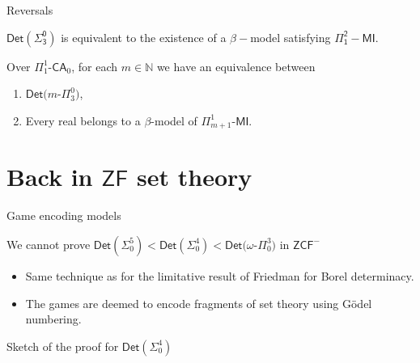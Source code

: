 \documentclass{beamer} %
\begin{document}

\begin{frame}{Reversals}
 
    \begin{theorem}[Hachtman]
        $\mathsf{Det(\Sigma_3^0)}$ is equivalent to the existence of a $\beta-$model 
        satisfying $\mathsf{\Pi_1^2-MI}$.
    \end{theorem}

    \begin{theorem}
        Over $\Pi_1^1$-$\mathsf{CA}_0$, for each $m\in \mathbb{N}$ we have an 
        equivalence between 
        \begin{enumerate}
            \item $\mathsf{Det}(m$-$\Pi_3^0)$,
            \item Every real belongs to a $\beta$-model of $\Pi_{m+1}^1$-$\mathsf{MI}$.
        \end{enumerate}
    \end{theorem}
\end{frame}


\section{Back in \texorpdfstring{$\mathsf{ZF}$}{ZF} set theory}

\begin{frame}{Game encoding models}
    \begin{theorem}
        We cannot prove $\mathsf{Det}(\Sigma_0^5)<\mathsf{Det}(\Sigma_0^4)
        <\mathsf{Det}(\omega$-$\Pi_0^3)$ in $\mathsf{ZCF^-}$ 
    \end{theorem}

    \begin{itemize}
        \item<2-> Same technique as for the limitative result of Friedman for 
            Borel determinacy.
        \item<3-> The games are deemed to encode fragments of set theory using Gödel numbering.
    \end{itemize}
\end{frame}


\begin{frame}{Sketch of the proof for $\mathsf{Det}(\Sigma_0^4)$}
    
\end{frame}
\end{document}
